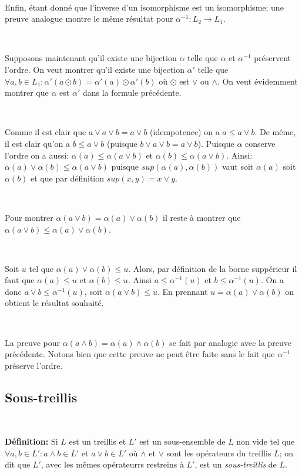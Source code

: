 \documentclass[a4paper, 11pt]{article}
\begin{document}
\

Enfin, étant donné que l'inverse d'un isomorphisme est un isomorphisme; une preuve analogue montre le même résultat pour $\alpha^{-1}: L_2 \rightarrow L_1$.

\

Supposons maintenant qu'il existe une bijection $\alpha$ telle que $\alpha$ et $\alpha^{-1}$ préservent l'ordre. On veut montrer qu'il existe une bijection $\alpha'$ telle que $\forall a,b \in L_1: \alpha'(a \odot b) = \alpha'(a) \odot \alpha'(b)$ où $\odot$ est $\lor$ ou $\land$. On veut évidemment montrer que $\alpha$ est $\alpha'$ dans la formule précédente.

\

Comme il est clair que $a \lor a \lor b = a \lor b$ (idempotence) on a $a \leq a \lor b$. De même, il est clair qu'on a $b \leq a \lor b$ (puisque $b \lor a \lor b = a \lor b$). Puisque $\alpha$ conserve l'ordre on a aussi: $\alpha(a) \leq \alpha(a \lor b)$ et $\alpha(b) \leq \alpha(a \lor b)$. Ainsi: $\alpha(a) \lor \alpha(b) \leq \alpha(a \lor b)$ puisque $sup(\alpha(a),\alpha(b))$ vaut soit $\alpha(a)$ soit $\alpha(b)$ et que par définition $sup(x,y) = x \lor y$.

\

Pour montrer $\alpha(a \lor b) = \alpha(a) \lor \alpha(b)$ il reste à montrer que $\alpha(a \lor b) \leq \alpha(a) \lor \alpha(b)$.

\

Soit $u$ tel que $\alpha(a) \lor \alpha(b) \leq u$. Alors, par définition de la borne suppérieur il faut que $\alpha(a) \leq u$ et $\alpha(b) \leq u$. Ainsi $a \leq \alpha^{-1}(u)$ et $b \leq \alpha^{-1}(u)$. On a donc $a \lor b \leq \alpha^{-1}(u)$, soit $\alpha(a \lor b) \leq u$. En prennant $u = \alpha(a) \lor \alpha(b)$ on obtient le résultat souhaité.

\

La preuve pour $\alpha(a \land b) = \alpha(a) \land \alpha(b)$ se fait par analogie avec la preuve précédente. Notons bien que cette preuve ne peut être faite sans le fait que $\alpha^{-1}$ préserve l'ordre.

\newpage

\subsection{Sous-treillis}

\

\begin{tcolorbox} 
	\textbf{Définition:} Si $L$ est un treillis et $L'$ est un sous-ensemble de $L$ non vide tel que $\forall a,b \in L': a \land b \in L'$ et $a \lor b \in L'$ où $\land$ et $\lor$ sont les opérateurs du treillis $L$; on dit que $L'$, avec les mêmes opérateurrs restreins à $L'$, est un \textit{sous-treillis} de $L$.
\end{tcolorbox}
\end{document}
